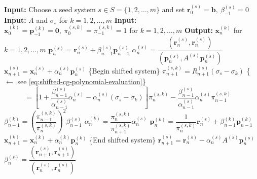 \begin{algorithm}[H]\caption{{The shifted CG method}}\label{alg:shifted-cg}\begin{algorithmic}[1]
\Statex\textbf{Input:} {Choose a seed system $s\in S=\{1,2,\ldots,m\}$ and set $\bm r_0^{(s)}=\bm b,\ \beta_{-1}^{(s)}=0$}
\Statex\textbf{Input:} $A$ {and} $\sigma_s$ {for} $k=1,2,\ldots,m$
\Statex\textbf{Input:} $\bm x_0^{(k)}=\bm p_{-1}^{(k)}=\bm0,\ \pi_0^{(s,k)}=\pi_{-1}^{(s,k)}=1$ {for} $k=1,2,\ldots,m$
\Statex\textbf{Output:} $\bm x_n^{(k)}$ {for} $k=1,2,\ldots,m$
\State $\bm p_n^{(s)}=\bm r_n^{(s)}+\beta_{n-1}^{(s)}\bm p_{n-1}^{(s)}$
\State $\alpha_n^{(s)}=\dfrac{(\bm r_n^{(s)},\bm r_n^{(s)})}{(\bm p_n^{(s)},A^{(s)}\bm p_n^{(s)})}$
\State $\bm x_{n+1}^{(s)}=\bm x_n^{(s)}+\alpha_n^{(s)}\bm p_n^{(s)}$
\State \{{Begin shifted system}\}
\State $\pi_{n+1}^{(s,k)}=R_{n+1}^{(s)}(\sigma_s-\sigma_k)$ \{{$\leftarrow$ see \eqref{eq:shifted-cg-polynomial-evaluation}}\}
\State $\phantom{\pi_{n+1}^{(s,k)}}=\left[1+\dfrac{\beta_{n-1}^{(s)}}{\alpha_{n-1}^{(s)}}\alpha_n^{(s)}-\alpha_n^{(s)}(\sigma_s-\sigma_k)\right]\pi_n^{(s,k)}-\dfrac{\beta_{n-1}^{(s)}}{\alpha_{n-1}^{(s)}}\alpha_n^{(s)}\pi_{n-1}^{(s,k)}$
\State $\beta_{n-1}^{(k)}=\left(\dfrac{\pi_{n-1}^{(s,k)}}{\pi_n^{(s,k)}}\right)^2\beta_{n-1}^{(s)}$
\State $\alpha_n^{(k)}=\dfrac{\pi_n^{(s,k)}}{\pi_{n+1}^{(s,k)}}\alpha_n^{(s)}$
\State $\bm p_n^{(k)}=\dfrac1{\pi_n^{(s,k)}}\bm r_n^{(s)}+\beta_{n-1}^{(k)}\bm p_{n-1}^{(k)}$
\State $\bm x_{n+1}^{(k)}=\bm x_n^{(k)}+\alpha_n^{(k)}\bm p_n^{(k)}$
\EndIf\EndFor
\State \{{End shifted system}\}
\State $\bm r_{n+1}^{(s)}=\bm r_n^{(s)}-\alpha_n^{(s)}A^{(s)}\bm p_n^{(s)}$
\State $\beta_n^{(s)}=\dfrac{(\bm r_{n+1}^{(s)},\bm r_{n+1}^{(s)})}{(\bm r_n^{(s)},\bm r_n^{(s)})}$
\EndFor\end{algorithmic}\end{algorithm}
